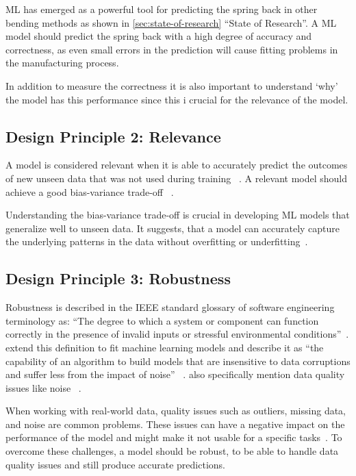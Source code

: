 \ac{ML} has emerged as a powerful tool for predicting the spring back in other bending
methods as shown in \cref{sec:state-of-research} ``State of Research''.
A \ac{ML} model should predict the spring back with a high degree of accuracy and
correctness, as even small errors in the prediction will cause fitting problems in the
manufacturing process\cite[p. 1]{cruz2021application}.

In addition to measure the correctness it is also important to understand `why'
the model has this performance since this i crucial for the relevance of the model.


\subsection*{Design Principle 2: Relevance}
A model is considered relevant when it is able to accurately predict the outcomes of
new unseen data that was not used during training
~\cite[p. 49]{zhou2021machine}.
A relevant model should achieve a good bias-variance trade-off
~\cite[p. 16]{siebert2022construction}.

Understanding the bias-variance trade-off is crucial in developing \ac{ML} models that
generalize well to unseen data.
It suggests, that a model can accurately capture the underlying patterns in the data
without overfitting or underfitting~\cite[p. 16]{siebert2022construction}.


\subsection*{Design Principle 3: Robustness}
Robustness is described in the IEEE standard glossary of software engineering terminology as:
``The degree to which a system or component can function correctly in the presence of
invalid inputs or stressful environmental conditions''~\cite[p. 64]{terminology1990ieee}.
\cite{saez2016evaluating} extend this definition to fit machine learning
models and describe it as ``the capability of an algorithm to build models that are insensitive to
data corruptions and suffer less from the impact of noise''
~\cite[p. 2]{saez2016evaluating}.
\cite{siebert2022construction} also specifically mention data quality issues like
noise ~\cite[p. 16]{siebert2022construction}.

When working with real-world data, quality issues such as outliers, missing data, and
noise are common problems.
These issues can have a negative impact on the performance of the model and might make it not usable for a specific
tasks~\cite[p. 1]{scher2022robustness}.
To overcome these challenges, a model should be robust, to be able to handle data quality issues and still produce
accurate predictions.


